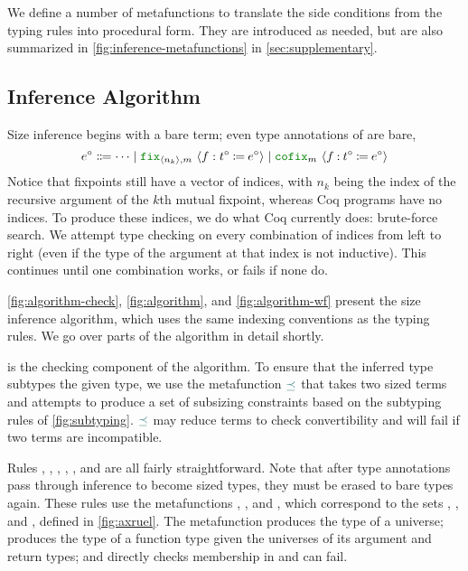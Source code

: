 We define a number of metafunctions to translate the side conditions from the typing rules into procedural form.
They are introduced as needed, but are also summarized in \autoref{fig:inference-metafunctions} in \autoref{sec:supplementary}.

\subsection{Inference Algorithm}




Size inference begins with a bare term; even type annotations of \cofixpoints are bare, \ie
  $$e^\circ \Coloneqq \dots
    \mid \fix{\seq{n_k}, m}{f}{t^\circ}{e^\circ}
    \mid \cofix{m}{f}{t^\circ}{e^\circ}$$
Notice that fixpoints still have a vector of indices, with $n_k$ being the index of the recursive argument of the $k$th mutual fixpoint, whereas Coq programs have no indices.
To produce these indices, we do what Coq currently does: brute-force search.
We attempt type checking on every combination of indices from left to right (even if the type of the argument at that index is not inductive).
This continues until one combination works, or fails if none do.

\autoref{fig:algorithm-check}, \autoref{fig:algorithm}, and \autoref{fig:algorithm-wf} present the size inference algorithm, which uses the same indexing conventions as the typing rules.
We go over parts of the algorithm in detail shortly.

 is the checking component of the algorithm.
To ensure that the inferred type subtypes the given type, we use the metafunction $\constrain$ that takes two sized terms and attempts to produce a set of subsizing constraints based on the subtyping rules of \autoref{fig:subtyping}.
$\constrain$ may reduce terms to check convertibility and will fail if two terms are incompatible.

Rules , , , , , and  are all fairly straightforward.
Note that after type annotations pass through inference to become sized types, they must be erased to bare types again.
These rules use the metafunctions \axiom, , and \elim, which correspond to the sets \Axioms, \Rules, and \Elims, defined in \autoref{fig:axruel}.
The metafunction \axiom produces the type of a universe;  produces the type of a function type given the universes of its argument and return types; and \elim directly checks membership in \Elims and can fail.

